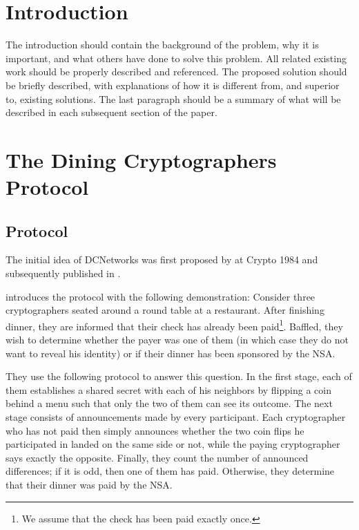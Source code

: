 \section{Introduction}

The introduction should contain the background of the problem, why it is important, and what others have done to solve this problem. All related existing work should be properly described and referenced. The proposed solution should be briefly described, with explanations of how it is different from, and superior to, existing solutions. The last paragraph should be a summary of what will be described in each subsequent section of the paper.
\cite{waidner1989dining}

\section{The Dining Cryptographers Protocol}


\subsection{Protocol}

The initial idea of \acp{DCNetwork} was first proposed by \citeauthor{journals/joc/Chaum88}
at Crypto 1984 and subsequently published in \citeyear{journals/joc/Chaum88} \cite{journals/joc/Chaum88}.

\citeauthor{journals/joc/Chaum88} introduces the protocol with the following demonstration:
Consider three cryptographers seated around a round table at a restaurant.
After finishing dinner, they are informed that their check has already been paid\footnote{
We assume that the check has been paid exactly once.}.
Baffled, they wish to determine whether the payer was one of them (in which case
they do not want to reveal his identity) or if their dinner has been sponsored by the NSA.

They use the following protocol to answer this question.
In the first stage, each of them establishes a shared secret with each of his neighbors by flipping
a coin behind a menu such that only the two of them can see its outcome. The next stage
consists of announcements made by every participant. Each cryptographer
who has not paid then simply announces whether the two coin flips he participated
in landed on the same side or not, while the paying cryptographer says exactly the opposite.
Finally, they count the number of announced differences; if it is odd, then one of them has paid.
Otherwise, they determine that their dinner was paid by the NSA.

